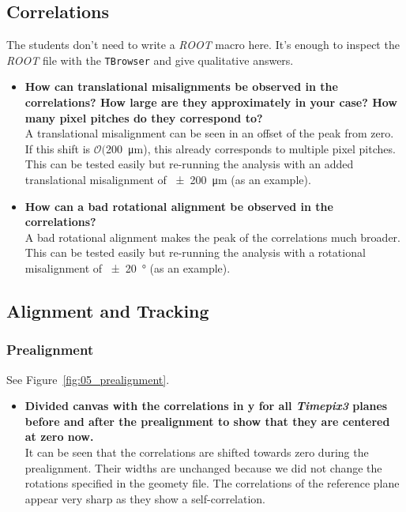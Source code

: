 \documentclass[a4paper,11pt]{article}
\newcommand*{\cernroot}{\emph{ROOT}\xspace}
\newcommand*{\tpx}{\emph{Timepix3}\xspace}
\newcommand*{\code}[1]{\texttt{#1}}
\begin{document}
\subsection{Correlations}
The students don't need to write a \cernroot macro here.
It's enough to inspect the \cernroot file with the \code{TBrowser} and give qualitative answers.
\begin{itemize}
\item \textbf{How can translational misalignments be observed in the correlations? How large are they approximately in your case? How many pixel pitches do they correspond to?}\\
A translational misalignment can be seen in an offset of the peak from zero. If this shift is $\mathcal{O}($\SI{200}{\micro m}), this already corresponds to multiple pixel pitches.
This can be tested easily but re-running the analysis with an added translational misalignment of \SI{\pm200}{\micro m} (as an example).
\item \textbf{How can a bad rotational alignment be observed in the correlations?}\\
A bad rotational alignment makes the peak of the correlations much broader.
This can be tested easily but re-running the analysis with a rotational misalignment of \SI{\pm20}{\degree} (as an example).
\end{itemize}

\subsection{Alignment and Tracking}

\subsubsection{Prealignment}
See Figure~\ref{fig:05_prealignment}.
\begin{itemize}
\item \textbf{Divided canvas with the correlations in y for all \tpx planes before and after the prealignment to show that they are centered at zero now.}\\
It can be seen that the correlations are shifted towards zero during the prealignment. Their widths are unchanged because we did not change the rotations specified in the geomety file.
The correlations of the reference plane appear very sharp as they show a self-correlation.
\end{itemize}
\end{document}
